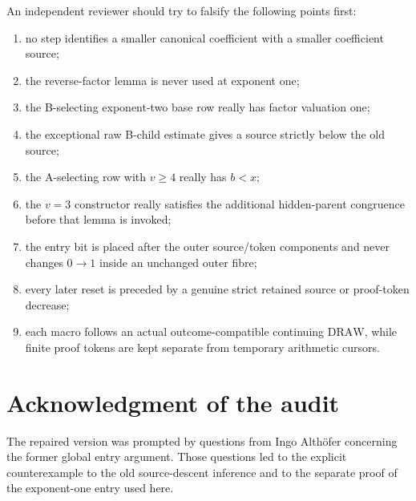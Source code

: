 \documentclass[11pt]{article}
\newcommand{\DRAW}{\ensuremath{\mathrm{DRAW}}}
\begin{document}
An independent reviewer should try to falsify the following points first:
\begin{enumerate}
\item no step identifies a smaller canonical coefficient with a smaller
      coefficient source;
\item the reverse-factor lemma is never used at exponent one;
\item the B-selecting exponent-two base row really has factor valuation one;
\item the exceptional raw B-child estimate gives a source strictly below the
      old source;
\item the A-selecting row with $v\ge4$ really has $b<x$;
\item the $v=3$ constructor really satisfies the additional hidden-parent
      congruence before that lemma is invoked;
\item the entry bit is placed after the outer source/token components and
      never changes $0\to1$ inside an unchanged outer fibre;
\item every later reset is preceded by a genuine strict retained source or
      proof-token decrease;
\item each macro follows an actual outcome-compatible continuing \DRAW, while
      finite proof tokens are kept separate from temporary arithmetic cursors.
\end{enumerate}

\section*{Acknowledgment of the audit}
The repaired version was prompted by questions from Ingo Alth\"ofer concerning
the former global entry argument. Those questions led to the explicit
counterexample to the old source-descent inference and to the separate proof of
the exponent-one entry used here.
\end{document}
